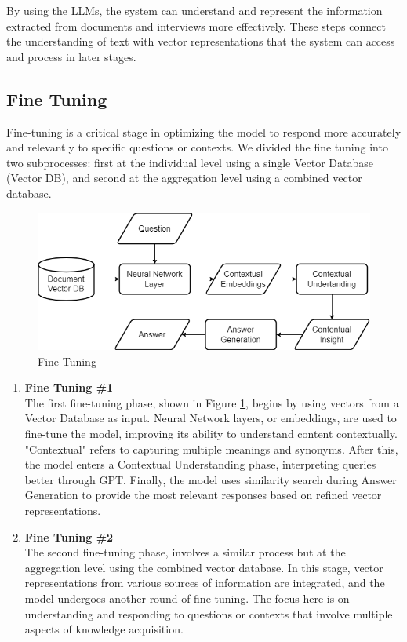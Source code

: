 \documentclass[runningheads]{llncs}
\begin{document}
By using the LLMs, the system can understand and represent the information extracted from documents and interviews more effectively. These steps connect the understanding of text with vector representations that the system can access and process in later stages.

\subsection{Fine Tuning}
Fine-tuning is a critical stage in optimizing the model to respond more accurately and relevantly to specific questions or contexts. We divided the fine tuning into two subprocesses: first at the individual level using a single Vector Database (Vector DB), and second at the aggregation level using a combined vector database.

\begin{figure}[htbp]
    \centerline{\includegraphics[scale=0.4]{eng-fine1.png}}
    \caption{Fine Tuning}
    \label{fig:fine-tuning-1}
\end{figure}

\begin{enumerate}
    \item \textbf{Fine Tuning \#1} \\
    The first fine-tuning phase, shown in Figure \ref{fig:fine-tuning-1}, begins by using vectors from a Vector Database as input. Neural Network layers, or embeddings, are used to fine-tune the model, improving its ability to understand content contextually. "Contextual" refers to capturing multiple meanings and synonyms. After this, the model enters a Contextual Understanding phase, interpreting queries better through GPT. Finally, the model uses similarity search during Answer Generation to provide the most relevant responses based on refined vector representations.
                    
    \item \textbf{Fine Tuning \#2} \\
        The second fine-tuning phase, involves a similar process but at the aggregation level using the combined vector database. In this stage, vector representations from various sources of information are integrated, and the model undergoes another round of fine-tuning. The focus here is on understanding and responding to questions or contexts that involve multiple aspects of knowledge acquisition.
\end{enumerate}
\end{document}
